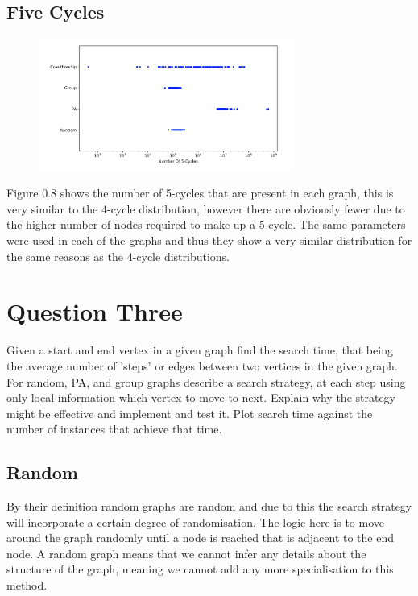 \documentclass[paper=a4, fontsize=11pt]{scrartcl}
\numberwithin{equation}{section}		%
\numberwithin{figure}{section}			%
\numberwithin{table}{section}				%
\begin{document}
\subsection*{Five Cycles}

\begin{figure}[p]
\center
\caption{}
\includegraphics[width=0.75\textwidth]{pictures/5cycle.png}
\end{figure}

Figure 0.8 shows the number of 5-cycles that are present in each graph, this is very similar to the 4-cycle distribution, however there are obviously fewer due to the higher number of nodes required to make up a 5-cycle. The same parameters were used in each of the graphs and thus they show a very similar distribution for the same reasons as the 4-cycle distributions.

\section*{Question Three}

Given a start and end vertex in a given graph find the search time, that being the average number of 'steps' or edges between two vertices in the given graph. For random, PA, and group graphs describe a search strategy, at each step using only local information which vertex to move to next. Explain why the strategy might be effective and implement and test it. Plot search time against the number of instances that achieve that time.

\subsection*{Random}

By their definition random graphs are random and due to this the search strategy will incorporate a certain degree of randomisation. The logic here is to move around the graph randomly until a node is reached that is adjacent to the end node. A random graph means that we cannot infer any details about the structure of the graph, meaning we cannot add any more specialisation to this method. \\
\end{document}
